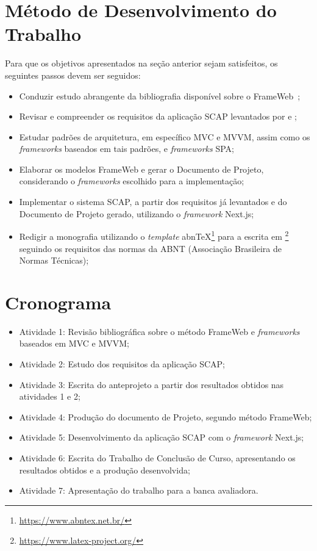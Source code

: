\section{Método de Desenvolvimento do Trabalho}
\label{sec-intro-met}

Para que os objetivos apresentados na seção anterior sejam satisfeitos, os seguintes passos devem ser seguidos:

\begin{itemize}
    \item Conduzir estudo abrangente da bibliografia disponível sobre o FrameWeb~\cite{souza:2007,souza:2020};
    \item Revisar e compreender os requisitos da aplicação SCAP levantados por  e ;
    \item Estudar padrões de arquitetura, em específico MVC e MVVM, assim como os \textit{frameworks} baseados em tais padrões, e \textit{frameworks} SPA;
    \item Elaborar os modelos FrameWeb e gerar o Documento de Projeto, considerando o \textit{frameworks} escolhido para a implementação;
    \item Implementar o sistema SCAP, a partir dos requisitos já levantados e do Documento de Projeto gerado, utilizando o \textit{framework} Next.js;
    \item Redigir a monografia utilizando o \textit{template} abnTeX\footnote{\url{https://www.abntex.net.br/}} para a escrita em \latex\footnote{\url{https://www.latex-project.org/}} seguindo os requisitos das normas da ABNT (Associação Brasileira de Normas Técnicas);
\end{itemize}


\section{Cronograma}
\label{sec-intro-crono}

\begin{itemize}
\item Atividade 1: Revisão bibliográfica sobre o método FrameWeb e \textit{frameworks} baseados em MVC e MVVM;
\item Atividade 2: Estudo dos requisitos da aplicação SCAP;
\item Atividade 3: Escrita do anteprojeto a partir dos resultados obtidos nas atividades 1 e 2;
\item Atividade 4: Produção do documento de Projeto, segundo método FrameWeb;
\item Atividade 5: Desenvolvimento da aplicação SCAP com o \textit{framework} Next.js;
\item Atividade 6: Escrita do Trabalho de Conclusão de Curso, apresentando os resultados obtidos e a produção desenvolvida;
\item Atividade 7: Apresentação do trabalho para a banca avaliadora.
\end{itemize}

